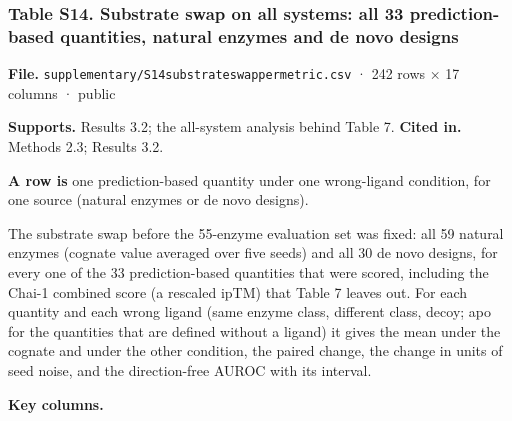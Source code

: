 \documentclass[
  10pt,
]{article}
\DeclareRobustCommand{\_}{\textunderscore\hspace{0pt}}
\begin{document}
\hypertarget{S14}{%
\subsubsection{Table
S14. Substrate swap
on all systems: all
33 prediction-based
quantities, natural
enzymes and de novo
designs}\label{S14}}

\begin{shaded}\small

\textbf{File.}
\texttt{supplementary/S14\_substrate\_swap\_per\_metric.csv}
· 242 rows × 17
columns · public

\textbf{Supports.}
Results 3.2; the
all-system analysis
behind Table 7.
\textbf{Cited in.}
Methods 2.3; Results
3.2.

\textbf{A row is}
one prediction-based
quantity under one
wrong-ligand
condition, for one
source (natural
enzymes or de novo
designs).

\end{shaded}

The substrate swap
before the 55-enzyme
evaluation set was
fixed: all 59
natural enzymes
(cognate value
averaged over five
seeds) and all 30 de
novo designs, for
every one of the 33
prediction-based
quantities that were
scored, including
the Chai-1 combined
score (a rescaled
ipTM) that Table 7
leaves out. For each
quantity and each
wrong ligand (same
enzyme class,
different class,
decoy; apo for the
quantities that are
defined without a
ligand) it gives the
mean under the
cognate and under
the other condition,
the paired change,
the change in units
of seed noise, and
the direction-free
AUROC with its
interval.

\textbf{Key
columns.}
\end{document}
